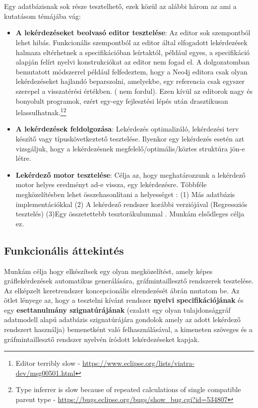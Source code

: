 \chapter{\attekintes}
\label{chp:3}

Egy adatbázisnak sok része tesztelhető, ezek közül az alábbi három az ami a kutatásom témájába vág:
\begin{itemize}
	\item  \textbf{A lekérdezéseket beolvasó editor tesztelése}: Az editor sok szempontból lehet hibás. Funkcionális szempontból az editor által elfogadott lekérdezések halmaza eltérhetnek a specifikációban leírtaktól, például egyes, a specifikáció alapján felírt nyelvi konstrukciókat az editor nem fogad el. A dolgozatomban bemutatott módszerrel például felfedeztem, hogy a Neo4j  editora csak olyan lekérdezéseket hajlandó beparszolni, amelyekbe, egy referencia csak egyszer szerepel a visszatérési értékben. ( nem fordul). Ezen kívül az editorok nagy és bonyolult programok, ezért egy-egy fejlesztési lépés után drasztikusan lelassulhatnak.\footnote{Editor terribly slow - \url{https://www.eclipse.org/lists/viatra-dev/msg00501.html}}\footnote{Type inferrer is slow because of repeated calculations of single compatible parent type - \url{https://bugs.eclipse.org/bugs/show_bug.cgi?id=534807}}
	\item \textbf{A lekérdezések feldolgozása}: Lekérdezés optimalizáló, lekérdezési terv készítő vagy típuskövetkeztető tesztelése. Ilyenkor egy lekérdezés esetén azt vizsgáljuk, hogy a lekérdezésnek megfelelő/optimális/köztes struktúra jön-e létre.
	\item \textbf{Lekérdező motor tesztelése}:  Célja az, hogy meghatározzunk a lekérdező motor helyes eredményt ad-e vissza, egy lekérdezésre. Többféle megközelítésben lehet összehasonlítani a helyességet : (1) Más adatbázis implementációkkal (2) A lekérdező rendszer korábbi verziójával (Regressziós tesztelés) \cite{yan2018snowtrail} (3)Egy összetettebb tesztorákulummal \cite{DBLP}. Munkám elsődleges célja ez.
\end{itemize}



\section{Funkcionális áttekintés}

Munkám célja hogy elkészítsek egy olyan megközelítést, amely képes gráflekérdezések automatikus generálására, gráfmintaillesztő rendszerek tesztelése. Az elképzelt  keretrendszer koncepcionális elrendezését   ábrán mutatom be. Az ötlet lényege az, hogy a tesztelni kívánt rendszer \textbf{nyelvi specifikációjának} és egy \textbf{esettanulmány szignatúrájának} (ezalatt egy olyan tulajdonsággráf adatmodell alapú adatbázis szignatúrájára gondolok amely az adott lekérdező rendszert használja) bemenetként való felhasználásával, a kimeneten szöveges és a gráfmintaillesztő rendszer nyelvén íródott lekérdezéseket kapjak. 

